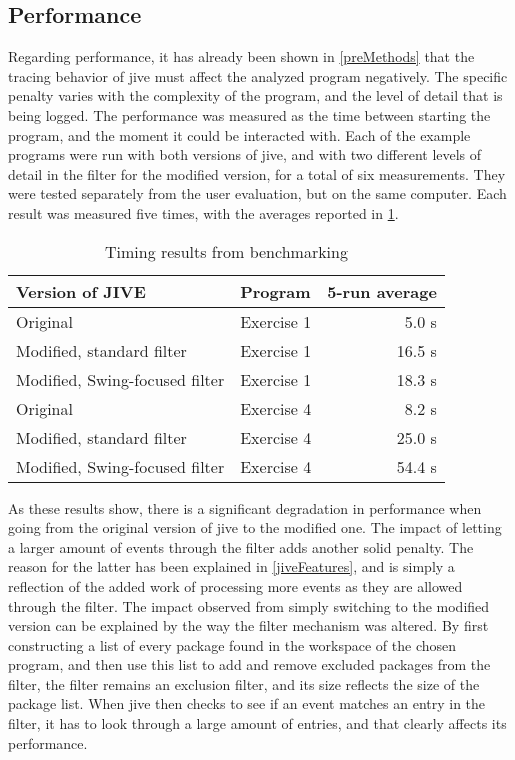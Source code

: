 \subsection{Performance}\label{jiveEvalPerf}
Regarding performance, it has already been shown in \cref{preMethods} that the tracing behavior of \gls{jive} must affect the analyzed program negatively.
The specific penalty varies with the complexity of the program, and the level of detail that is being logged.
The performance was measured as the time between starting the program, and the moment it could be interacted with.
Each of the example programs were run with both versions of \gls{jive}, and with two different levels of detail in the filter for the modified version, for a total of six measurements.
They were tested separately from the user evaluation, but on the same computer.
Each result was measured five times, with the averages reported in \cref{tab:testPerf}.



\begin{table}[H]
	\begin{center}
		\caption{Timing results from benchmarking}
		\label{tab:testPerf}
		\begin{tabular}{llr}
			\toprule
			Version of JIVE & Program & 5-run average\\ \midrule
			Original& Exercise 1 & 5.0 s\\
			Modified, standard filter & Exercise 1 & 16.5 s\\
			Modified, Swing-focused filter & Exercise 1 & 18.3 s\\
			Original& Exercise 4 & 8.2 s\\ 
			Modified, standard filter & Exercise 4 & 25.0 s\\ 
			Modified, Swing-focused filter & Exercise 4 & 54.4 s\\ \bottomrule
		\end{tabular}
	\end{center}
\end{table}

As these results show, there is a significant degradation in performance when going from the original version of \gls{jive} to the modified one.
The impact of letting a larger amount of events through the filter adds another solid penalty.
The reason for the latter has been explained in \cref{jiveFeatures}, and is simply a reflection of the added work of processing more events as they are allowed through the filter.
The impact observed from simply switching to the modified version can be explained by the way the filter mechanism was altered.
By first constructing a list of every package found in the workspace of the chosen program, and then use this list to add and remove excluded packages from the filter, the filter remains an exclusion filter, and its size reflects the size of the package list.
When \gls{jive} then checks to see if an event matches an entry in the filter, it has to look through a large amount of entries, and that clearly affects its performance.

